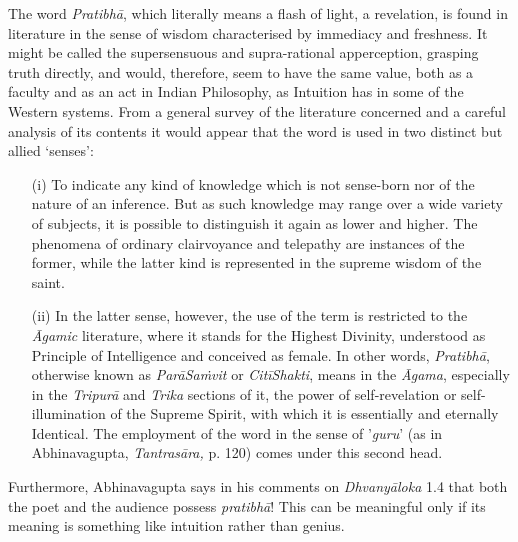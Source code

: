 \begin{myquote}
The word \textsl{Pratibhā}, which literally means a flash of light, a revelation, is found in literature in the sense of wisdom characterised by immediacy and freshness. It might be called the supersensuous and supra-rational apperception, grasping truth directly, and would, therefore, seem to have the same value, both as a faculty and as an act in Indian Philosophy, as Intuition has in some of the Western systems. From a general survey of the literature concerned and a careful analysis of its contents it would appear that the word is used in two distinct but allied ‘senses': 
\begin{itemize}
\item[(i)] To indicate any kind of knowledge which is not sense-born nor of the nature of an inference. But as such knowledge may range over a wide variety of subjects, it is possible to distinguish it again as lower and higher. The phenomena of ordinary clairvoyance and telepathy are instances of the former, while the latter kind is represented in the supreme wisdom of the saint.

\item[(ii)] In the latter sense, however, the use of the term is restricted to the \textsl{Āgamic} literature, where it stands for the Highest Divinity, understood as Principle of Intelligence and conceived as female. In other words, \textsl{Pratibhā}, otherwise known as \textsl{ParāSaṁvit} or \textsl{CitīShakti}, means in the \textsl{Āgama}, especially in the \textsl{Tripurā} and \textsl{Trika} sections of it, the power of self-revelation or self-illumination of the Supreme Spirit, with which it is essentially and eternally Identical. The employment of the word in the sense of '\textsl{guru}' (as in Abhinavagupta, \textsl{Tantrasāra,} p. 120) comes under this second head.
\end{itemize}
\end{myquote}

Furthermore, Abhinavagupta says in his comments on \textsl{Dhvanyāloka} 1.4 that both the poet and the audience possess \textsl{pratibhā}! This can be meaningful only if its meaning is something like intuition rather than genius.

